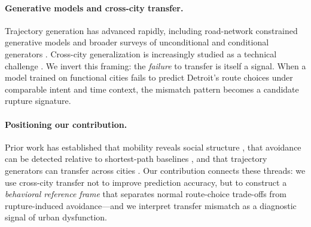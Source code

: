 \paragraph{Generative models and cross-city transfer.}
Trajectory generation has advanced rapidly, including road-network constrained generative models \citep{wei2024diffrntraj} and broader surveys of unconditional and conditional generators \citep{zhu2025survey}. Cross-city generalization is increasingly studied as a technical challenge \citep{zhang2025gtg}. We invert this framing: the \emph{failure} to transfer is itself a signal. When a model trained on functional cities fails to predict Detroit's route choices under comparable intent and time context, the mismatch pattern becomes a candidate rupture signature.

\paragraph{Positioning our contribution.}
Prior work has established that mobility reveals social structure \citep{moro2021mobility,nilforoshan2023mobility}, that avoidance can be detected relative to shortest-path baselines \citep{eftelioglu2018avoidance}, and that trajectory generators can transfer across cities \citep{zhang2025gtg}. Our contribution connects these threads: we use cross-city transfer not to improve prediction accuracy, but to construct a \emph{behavioral reference frame} that separates normal route-choice trade-offs from rupture-induced avoidance---and we interpret transfer mismatch as a diagnostic signal of urban dysfunction.
